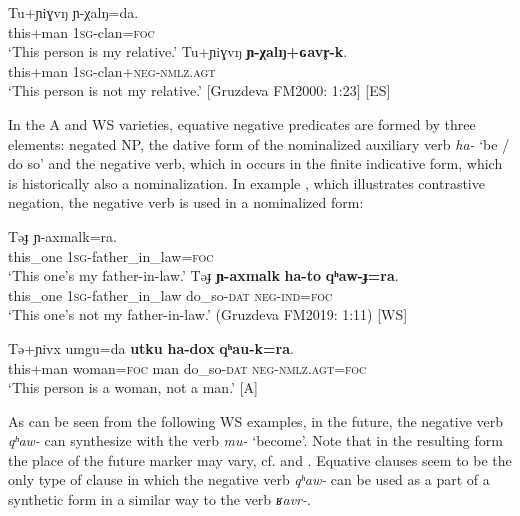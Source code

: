 \documentclass[output=paper,colorlinks,citecolor=brown]{langscibook}
\begin{document}
\ea\label{ex:niv:67}
    \ea\label{ex:niv:67a}
        \gll Tu+ɲiɣvŋ ɲ-χalŋ=da. \\ 
             this+man \textsc{1sg}{}-clan=\textsc{foc} \\
        \glt ‘This person is my relative.’
    \ex\label{ex:niv:67b}
        \gll Tu+ɲiɣvŋ \textbf{ɲ-χalŋ+ɢavr̥-k}. \\
             this+man \textsc{1sg}{}-clan+\textsc{neg-nmlz.agt} \\
        \glt ‘This person is not my relative.’ [Gruzdeva FM2000: 1:23] [ES]
    \z
\z 

In the A and WS varieties, equative negative predicates are formed by three elements: negated NP, the dative form of the nominalized auxiliary verb \textit{ha-} ‘be / do so’ and the negative verb, which in  occurs in the finite indicative form, which is historically also a nominalization. In example , which illustrates contrastive negation, the negative verb is used in a nominalized form:


\ea\label{ex:niv:68}
    \ea\label{ex:niv:68a}
        \gll Təɟ ɲ-axmalk=ra. \\ 
             this\_one \textsc{1sg}{}-father\_in\_law=\textsc{foc} \\
        \glt ‘This one’s my father-in-law.’
    \ex\label{ex:niv:68b}
        \gll Təɟ \textbf{ɲ-axmalk} \textbf{ha-to} \textbf{qʰaw-ɟ=ra}. \\
             this\_one \textsc{1sg}{}-father\_in\_law do\_so{}-\textsc{dat} \textsc{neg-ind=foc}\\
        \glt ‘This one’s not my father-in-law.’ (Gruzdeva FM2019: 1:11) [WS]
    \z
\z 

\ea\label{ex:niv:69}
    \gll Tə+ɲivx umgu=da \textbf{utku} \textbf{ha-dox} \textbf{qʰau-k=ra}. \\ 
         this+man woman=\textsc{foc} man do\_so{}-\textsc{dat} \textsc{neg-nmlz.agt=foc} \\
    \glt ‘This person is a woman, not a man.’ \citep[158]{Panfilov1965} [A]
\z 

As can be seen from the following WS examples, in the future, the negative verb \textit{qʰaw-} can synthesize with the verb \textit{mu-} ‘become’. Note that in the resulting form the place of the future marker may vary, cf.  and . Equative clauses seem to be the only type of clause in which the negative verb \textit{qʰaw-} can be used as a part of a synthetic form in a similar way to the verb \textit{ʁavr-}.
\end{document}
